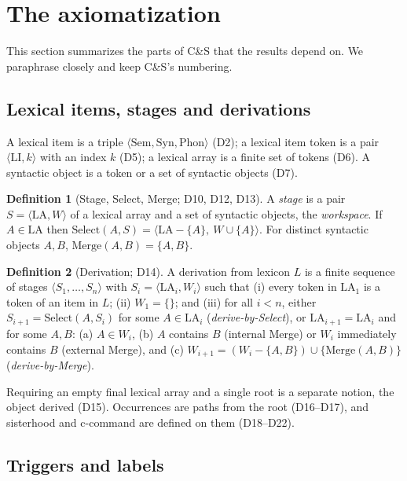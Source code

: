 \documentclass[11pt]{article}
\newcommand{\Def}[1]{D#1}
\newcommand{\LA}{\mathrm{LA}}
\newcommand{\Merge}{\mathrm{Merge}}
\newcommand{\Select}{\mathrm{Select}}
\newcommand{\pair}[1]{\langle #1 \rangle}
\theoremstyle{definition}
\newtheorem{definition}{Definition}
\theoremstyle{plain}
\begin{document}
\section{The axiomatization}
\label{sec:background}

This section summarizes the parts of C\&S that the results depend on. We
paraphrase closely and keep C\&S's numbering.

\subsection{Lexical items, stages and derivations}

A lexical item is a triple $\pair{\mathrm{Sem},\mathrm{Syn},\mathrm{Phon}}$
(\Def{2}); a lexical item token is a pair $\pair{\mathrm{LI},k}$ with an
index $k$ (\Def{5}); a lexical array is a finite set of tokens (\Def{6}). A
syntactic object is a token or a set of syntactic objects (\Def{7}).

\begin{definition}[Stage, Select, Merge; \Def{10}, \Def{12}, \Def{13}]
A \emph{stage} is a pair $S = \pair{\LA, W}$ of a lexical array and a set of
syntactic objects, the \emph{workspace}. If $A \in \LA$ then
$\Select(A,S) = \pair{\LA - \{A\},\ W \cup \{A\}}$. For distinct syntactic
objects $A,B$, $\Merge(A,B) = \{A,B\}$.
\end{definition}

\begin{definition}[Derivation; \Def{14}]
A derivation from lexicon $L$ is a finite sequence of stages
$\pair{S_1,\dots,S_n}$ with $S_i = \pair{\LA_i, W_i}$ such that (i) every
token in $\LA_1$ is a token of an item in $L$; (ii) $W_1 = \{\}$; and (iii)
for all $i<n$, either $S_{i+1} = \Select(A, S_i)$ for some $A\in\LA_i$
(\emph{derive-by-Select}), or $\LA_{i+1} = \LA_i$ and for some $A,B$:
(a) $A \in W_i$, (b) $A$ contains $B$ (internal Merge) or $W_i$ immediately
contains $B$ (external Merge), and (c)
$W_{i+1} = (W_i - \{A,B\}) \cup \{\Merge(A,B)\}$ (\emph{derive-by-Merge}).
\end{definition}

\noindent
Requiring an empty final lexical array and a single root is a separate
notion, the object derived (\Def{15}). Occurrences are paths from the root
(\Def{16}--\Def{17}), and sisterhood and c-command are defined on them
(\Def{18}--\Def{22}).

\subsection{Triggers and labels}
\end{document}
